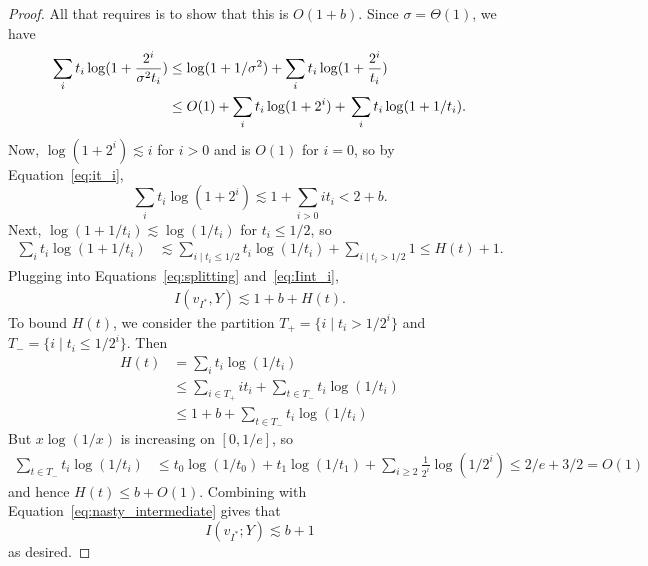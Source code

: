 \documentclass[twoside,leqno,twocolumn]{article}
\begin{document}
\begin{proof}
  All that requires is to show that this is $O(1 + b)$.  Since $\sigma
  = \Theta(1)$, we have
  \begin{align}
    \sum_i t_i \log(1 + \frac{2^i}{\sigma^2t_i})
    &\leq \log(1 + 1/\sigma^2) + \sum_i t_i \log(1 + \frac{2^i}{t_i})\notag\\
    &\leq O(1) + \sum_{i} t_i \log(1 + 2^i) +\phantom{}
\sum_{i} t_i \log(1 + 1/t_i).\label{eq:splitting}
  \end{align}
  Now, $\log(1 + 2^i) \lesssim i$ for $i > 0$ and is $O(1)$ for $i =
  0$, so by Equation~\eqref{eq:it_i},
  \[
  \sum_{i} t_i \log(1 + 2^i) \lesssim 1 + \sum_{i > 0} i t_i < 2 + b.
  \]
  Next, $\log(1 + 1/t_i) \lesssim \log(1/t_i)$ for $t_i \leq 1/2$, so
  \begin{align*}
    \sum_{i} t_i \log(1 + 1/t_i) &\lesssim \sum_{i \mid t_i \leq 1/2} t_i
    \log (1/t_i) + \sum_{i \mid t_i > 1/2} 1
\leq H(t) + 1.
  \end{align*}
  Plugging into Equations~\eqref{eq:splitting} and~\eqref{eq:Iint_i},
  \begin{align}\label{eq:nasty_intermediate}
    I(v_{I^*}, Y) \lesssim 1 + b +
    H(t).
  \end{align}
  To bound $H(t)$, we consider the partition $T_+ = \{i \mid t_i >
  1/2^i\}$ and $T_- = \{i \mid t_i \leq 1/2^i\}$.  Then
  \begin{align*}
    H(t) &= \sum_i t_i \log (1/t_i)\\
    &\leq \sum_{i \in T_+} i t_i + \sum_{t \in T_-} t_i \log (1/t_i)\\
    &\leq 1 + b + \sum_{t \in T_-} t_i \log (1/t_i)
  \end{align*}
  But $x \log (1/x)$ is increasing on $[0, 1/e]$, so
  \begin{align*}
    \sum_{t \in T_-} t_i \log (1/t_i) &\leq t_0 \log (1/t_0) + t_1 \log
    (1/t_1) +
\sum_{i \geq 2} \frac{1}{2^i} \log (1/2^i) 
\leq 2/e + 3/2 = O(1)
  \end{align*}
  and hence $H(t) \leq b + O(1)$.  Combining with
  Equation~\eqref{eq:nasty_intermediate} gives that
  \[
  I(v_{I^*}; Y) \lesssim b + 1
  \]
  as desired.
\end{proof}
\end{document}
